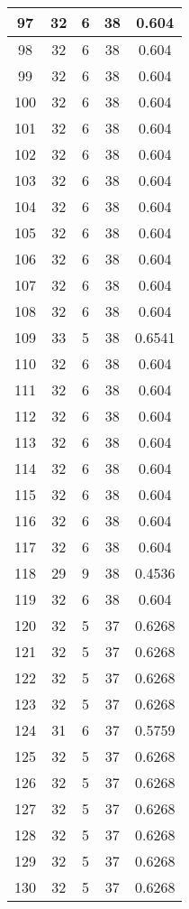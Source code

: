 \documentclass[letterpaper, 12pt]{article}
\begin{document}
\begin{longtable}{|c|c|c|c|c|}
\hline
97 & 32 & 6 & 38 & 0.604 \\
\hline
98 & 32 & 6 & 38 & 0.604 \\
\hline
99 & 32 & 6 & 38 & 0.604 \\
\hline
100 & 32 & 6 & 38 & 0.604 \\
\hline
101 & 32 & 6 & 38 & 0.604 \\
\hline
102 & 32 & 6 & 38 & 0.604 \\
\hline
103 & 32 & 6 & 38 & 0.604 \\
\hline
104 & 32 & 6 & 38 & 0.604 \\
\hline
105 & 32 & 6 & 38 & 0.604 \\
\hline
106 & 32 & 6 & 38 & 0.604 \\
\hline
107 & 32 & 6 & 38 & 0.604 \\
\hline
108 & 32 & 6 & 38 & 0.604 \\
\hline
109 & 33 & 5 & 38 & 0.6541 \\
\hline
110 & 32 & 6 & 38 & 0.604 \\
\hline
111 & 32 & 6 & 38 & 0.604 \\
\hline
112 & 32 & 6 & 38 & 0.604 \\
\hline
113 & 32 & 6 & 38 & 0.604 \\
\hline
114 & 32 & 6 & 38 & 0.604 \\
\hline
115 & 32 & 6 & 38 & 0.604 \\
\hline
116 & 32 & 6 & 38 & 0.604 \\
\hline
117 & 32 & 6 & 38 & 0.604 \\
\hline
118 & 29 & 9 & 38 & 0.4536 \\
\hline
119 & 32 & 6 & 38 & 0.604 \\
\hline
120 & 32 & 5 & 37 & 0.6268 \\
\hline
121 & 32 & 5 & 37 & 0.6268 \\
\hline
122 & 32 & 5 & 37 & 0.6268 \\
\hline
123 & 32 & 5 & 37 & 0.6268 \\
\hline
124 & 31 & 6 & 37 & 0.5759 \\
\hline
125 & 32 & 5 & 37 & 0.6268 \\
\hline
126 & 32 & 5 & 37 & 0.6268 \\
\hline
127 & 32 & 5 & 37 & 0.6268 \\
\hline
128 & 32 & 5 & 37 & 0.6268 \\
\hline
129 & 32 & 5 & 37 & 0.6268 \\
\hline
130 & 32 & 5 & 37 & 0.6268 \\
\hline

\end{longtable}
\end{document}
